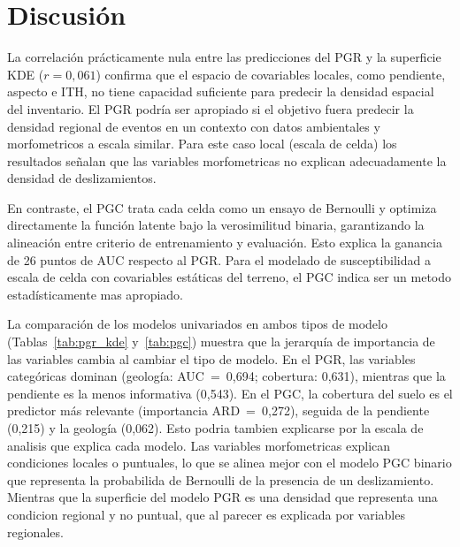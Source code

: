 \documentclass[letterpaper,11pt]{tec}
\begin{document}
{\section{Discusión}
\label{sec:discusion}

La correlación prácticamente nula entre las predicciones del PGR y la superficie KDE ($r = 0{,}061$) confirma que el espacio de
covariables locales, como pendiente, aspecto e ITH, no tiene capacidad suficiente para predecir la densidad espacial del inventario. 
El PGR podría ser apropiado si el objetivo fuera predecir la densidad regional 
de eventos en un contexto con datos ambientales y morfometricos a escala similar. Para este caso local (escala de celda) los resultados señalan 
que las variables morfometricas no explican adecuadamente la densidad de deslizamientos.

En contraste, el PGC trata cada celda como un ensayo de Bernoulli y optimiza directamente la función latente bajo la verosimilitud 
binaria, garantizando la alineación entre criterio de entrenamiento y evaluación. Esto explica la ganancia de 26 puntos de AUC
respecto al PGR. Para el modelado de susceptibilidad a escala de celda con covariables estáticas del terreno, el PGC indica ser un 
metodo estadísticamente mas apropiado.

La comparación de los modelos univariados en ambos tipos de modelo
(Tablas~\ref{tab:pgr_kde} y~\ref{tab:pgc}) muestra que la jerarquía de importancia de las variables cambia al cambiar el tipo de modelo.
En el PGR, las variables categóricas dominan (geología: AUC~=~0{,}694; cobertura: 0{,}631), mientras que la pendiente es la menos
informativa (0{,}543). En el PGC, la cobertura del suelo es el predictor más relevante (importancia ARD~=~0{,}272),
seguida de la pendiente (0{,}215) y la geología (0{,}062). Esto podria tambien explicarse por la escala de analisis que explica cada modelo.
Las variables morfometricas explican condiciones locales o puntuales, lo que se alinea mejor con el modelo PGC binario que representa
la probabilida de Bernoulli de la presencia de un deslizamiento. Mientras que la superficie del modelo PGR es una densidad que representa 
una condicion regional y no puntual, que al parecer es explicada por variables regionales.

}
\end{document}

